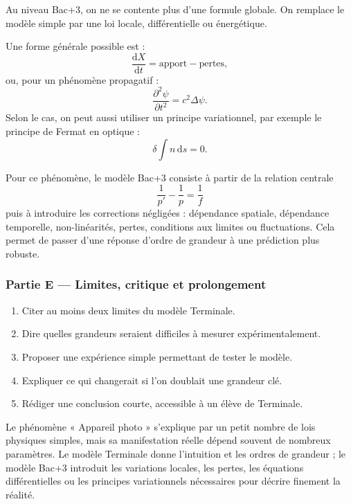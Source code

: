 \documentclass[11pt,a4paper]{article}
\begin{document}
\begin{approfondissementbox}
Au niveau Bac+3, on ne se contente plus d'une formule globale. On remplace le modèle simple par une loi locale, différentielle ou énergétique.

Une forme générale possible est :
\[
\frac{\mathrm d X}{\mathrm dt}=\text{apport}-\text{pertes},
\]
ou, pour un phénomène propagatif :
\[
\frac{\partial^2 \psi}{\partial t^2}=c^2\Delta\psi.
\]
Selon le cas, on peut aussi utiliser un principe variationnel, par exemple le principe de Fermat en optique :
\[
\delta \int n\,\mathrm ds=0.
\]

Pour ce phénomène, le modèle Bac+3 consiste à partir de la relation centrale
\[
\frac1{p'}-\frac1p=\frac1f
\]
puis à introduire les corrections négligées : dépendance spatiale, dépendance temporelle, non-linéarités, pertes, conditions aux limites ou fluctuations. Cela permet de passer d'une réponse d'ordre de grandeur à une prédiction plus robuste.
\end{approfondissementbox}

\subsubsection*{Partie E — Limites, critique et prolongement}

\begin{enumerate}
  \item Citer au moins deux limites du modèle Terminale.
  \item Dire quelles grandeurs seraient difficiles à mesurer expérimentalement.
  \item Proposer une expérience simple permettant de tester le modèle.
  \item Expliquer ce qui changerait si l'on doublait une grandeur clé.
  \item Rédiger une conclusion courte, accessible à un élève de Terminale.
\end{enumerate}

\begin{corrigebox}
Le phénomène « Appareil photo » s'explique par un petit nombre de lois physiques simples, mais sa manifestation réelle dépend souvent de nombreux paramètres. Le modèle Terminale donne l'intuition et les ordres de grandeur ; le modèle Bac+3 introduit les variations locales, les pertes, les équations différentielles ou les principes variationnels nécessaires pour décrire finement la réalité.
\end{corrigebox}
\end{document}
